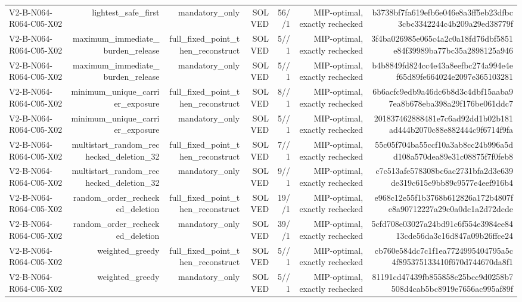 {\begin{longtable}{lrrrrrr}
V2-B-N064-R064-C05-X02 & lightest\_safe\_first & mandatory\_only & SOLVED & 56//1 & MIP-optimal, exactly rechecked & b3738bf7fa619efb6e046e8a3ff5eb23dfbc3cbc3342244c4b209a29ed38779f \\
V2-B-N064-R064-C05-X02 & maximum\_immediate\_burden\_release & full\_fixed\_point\_then\_reconstruct & SOLVED & 5//1 & MIP-optimal, exactly rechecked & 3f4ba026985e065c4a2c0a18fd76dbf5851e84f39989ba77bc35a2898125a946 \\
V2-B-N064-R064-C05-X02 & maximum\_immediate\_burden\_release & mandatory\_only & SOLVED & 5//1 & MIP-optimal, exactly rechecked & b4b8849fd824cc4e43a8eefbc274a994e4ef65d89fe664024e2097e365103281 \\
V2-B-N064-R064-C05-X02 & minimum\_unique\_carrier\_exposure & full\_fixed\_point\_then\_reconstruct & SOLVED & 8//1 & MIP-optimal, exactly rechecked & 6b6acfc9edb9a46dc6b8d3c4dbf15aaba97ea8b678eba398a29f176be061ddc7 \\
V2-B-N064-R064-C05-X02 & minimum\_unique\_carrier\_exposure & mandatory\_only & SOLVED & 5//1 & MIP-optimal, exactly rechecked & 201837462888481e7c6ad92dd1b02b181ad444b2070c88e882444c9f6714f9fa \\
V2-B-N064-R064-C05-X02 & multistart\_random\_rechecked\_deletion\_32 & full\_fixed\_point\_then\_reconstruct & SOLVED & 7//1 & MIP-optimal, exactly rechecked & 55c05f704ba55ccf10a3ab8cc24b996a5dd108a570dea89e31c08875f7f0feb8 \\
V2-B-N064-R064-C05-X02 & multistart\_random\_rechecked\_deletion\_32 & mandatory\_only & SOLVED & 9//1 & MIP-optimal, exactly rechecked & c7c513afe578308bc6ac2731bfa2d3e639de319c615e9bb89c9577e4eef916b4 \\
V2-B-N064-R064-C05-X02 & random\_order\_rechecked\_deletion & full\_fixed\_point\_then\_reconstruct & SOLVED & 19//1 & MIP-optimal, exactly rechecked & e968c12e55f1b3768b612826a172b4807fe8a90712227a29c0a0dc1a2d72dcde \\
V2-B-N064-R064-C05-X02 & random\_order\_rechecked\_deletion & mandatory\_only & SOLVED & 39//1 & MIP-optimal, exactly rechecked & 5cfd708e03027a24bd91c6f554e3984ee8413cde56da3c16d847a09b26ffce24 \\
V2-B-N064-R064-C05-X02 & weighted\_greedy & full\_fixed\_point\_then\_reconstruct & SOLVED & 5//1 & MIP-optimal, exactly rechecked & cb760e584dc7c1f1ea7724995404795a5c4f895375133410f670d744670da8f1 \\
V2-B-N064-R064-C05-X02 & weighted\_greedy & mandatory\_only & SOLVED & 5//1 & MIP-optimal, exactly rechecked & 81191cd47439fb855858c25bcc9d0258b7508d4cab5bc8919e7656ac995af89f \\

\end{longtable}}

